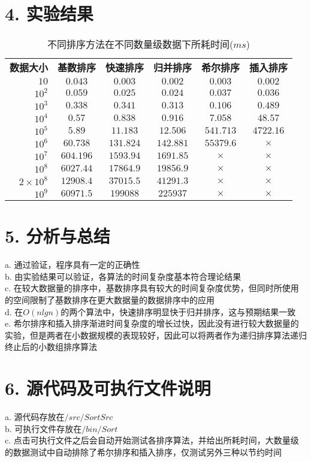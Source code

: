 \documentclass[12pt]{article}
\begin{document}
  \section*{4. 实验结果}
    \begin{table}[h!]
      \begin{center}
        \caption{不同排序方法在不同数量级数据下所耗时间($ms$)}
        \begin{tabular}{r|c|c|c|c|c}
          \toprule
          \textbf{数据大小} & \textbf{基数排序} & \textbf{快速排序} & \textbf{归并排序} & \textbf{希尔排序} & \textbf{插入排序}\\
          $10$ & $0.043$ & $0.003$ & $0.002$ & $0.003$ & $0.002$\\
          $10^2$ & $0.059$ & $0.025$ & $0.024$ & $0.037$ & $0.036$\\
          $10^3$ & $0.338$ & $0.341$ & $0.313$ & $0.106$ & $0.489$\\
          $10^4$ & $0.57$ & $0.838$ & $0.916$ & $7.058$ & $48.57$\\
          $10^5$ & $5.89$ & $11.183$ & $12.506$ & $541.713$ & $4722.16$\\
          $10^6$ & $60.738$ & $131.824$ & $142.881$ & $55379.6$ & $\times$\\
          $10^7$ & $604.196$ & $1593.94$ & $1691.85$ & $\times$ & $\times$\\
          $10^8$ & $6027.44$ & $17864.9$ & $19856.9$ & $\times$ & $\times$\\
          $2\times10^8$ & $12908.4$ & $37015.5$ & $41291.3$ & $\times$ & $\times$\\
          $10^9$ & $60971.5$ & $199088$ & $225937$ & $\times$ & $\times$\\
          \midrule
          \bottomrule
        \end{tabular}
      \end{center}
    \end{table}
  \section*{5. 分析与总结}
  a. 通过验证，程序具有一定的正确性\\
  b. 由实验结果可以验证，各算法的时间复杂度基本符合理论结果\\
  c. 在较大数据量的排序中，基数排序具有较大的时间复杂度优势，但同时所使用的空间限制了基数排序在更大数据量的数据排序中的应用\\
  d. 在$O(nlgn)$的两个算法中，快速排序明显快于归并排序，这与预期结果一致\\
  e. 希尔排序和插入排序渐进时间复杂度的增长过快，因此没有进行较大数据量的实验，但是两者在小数据规模的表现较好，因此可以将两者作为递归排序算法递归终止后的小数组排序算法
  \section*{6. 源代码及可执行文件说明}
  a. 源代码存放在$/src/SortSrc$\\
  b. 可执行文件存放在$/bin/Sort$\\
  c. 点击可执行文件之后会自动开始测试各排序算法，并给出所耗时间，大数量级的数据测试中自动排除了希尔排序和插入排序，仅测试另外三种以节约时间\\
\end{document}
